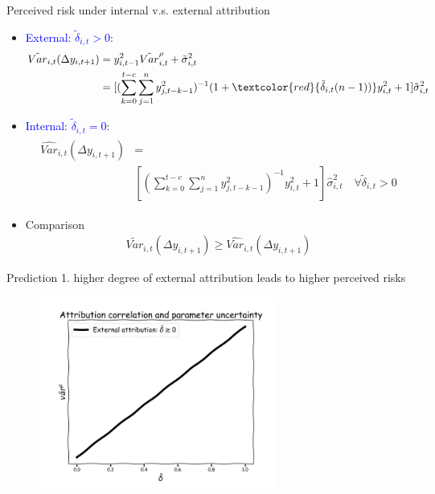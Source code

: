 \documentclass{beamer}
\begin{document}
\begin{frame}{Perceived risk under internal  v.s. external attribution}
	
	\begin{itemize}
		\item \textcolor{blue}{External: $\tilde \delta_{i,t} >0$}: 
	\begin{eqnarray}
	\begin{split}
	\tilde {Var}_{i,t}(\Delta y_{i,t+1}) & = y_{i,t-1}^2 \tilde{Var}^{\rho}_{i,t} + \tilde{\sigma}^2_{i,t} \\
	& = [(\sum^{t-c}_{k=0}\sum^{n}_{j=1}y^2_{j,t-k-1})^{-1}(1+\textcolor{red}{ \tilde\delta_{i,t}(n-1))}y^2_{i,t} + 1] \tilde{\sigma}^2_{i,t} 
	\end{split}
	\end{eqnarray}
		\item \textcolor{blue}{Internal: $\tilde \delta_{i,t} =0$}: 
		\begin{eqnarray}
	\begin{split}
	\widehat{Var}_{i,t}(\Delta y_{i,t+1}) & = \\
	& [(\sum^{t-c}_{k=0}\sum^{n}_{j=1}y^2_{j,t-k-1})^{-1}y^2_{i,t} + 1] \hat{\sigma}^2_{i,t} \quad \forall \tilde \delta_{i,t} >0
		\end{split}
	\end{eqnarray}
		\item Comparison 
		\begin{eqnarray}
		\tilde {Var}_{i,t}(\Delta y_{i,t+1}) \geq \widehat{Var}_{i,t}(\Delta y_{i,t+1})
		\end{eqnarray}
	\end{itemize}
	
\end{frame}


\begin{frame}{Prediction 1. higher degree of external attribution leads to higher perceived risks}
	\begin{figure}
		\centering 
		\label{var_experience_var}
		\includegraphics[width=0.7\textwidth]{figures/corr_var.jpg}
	\end{figure}
\end{frame}
\end{document}
